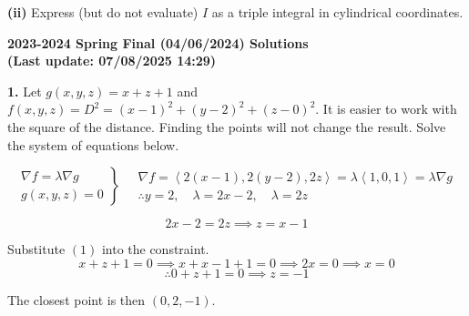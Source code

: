 \documentclass{article}
\begin{document}
\textbf{(ii)} Express (but do not evaluate) ${I}$ as a triple integral in cylindrical coordinates.

\newpage

\begin{center}
\textbf{2023-2024 Spring Final (04/06/2024) Solutions\\
(Last update: 07/08/2025 14:29)}
\end{center}

\textbf{1.} Let $g(x,y,z)=x+z+1$ and $f(x,y,z)=D^2=(x-1)^2+(y-2)^2+(z-0)^2$. It is easier to work with the square of the distance. Finding the points will not change the result. Solve the system of equations below.

\[
\left.
\begin{array}{l}
\displaystyle\nabla f=\lambda\nabla g \\
\displaystyle g(x,y,z)=0
\end{array}
\right\}\quad
\begin{array}{l}
\nabla f=\left\langle2(x-1),2(y-2),2z\right\rangle=\lambda\left\langle1,0,1\right\rangle=\lambda\nabla g\\\therefore y=2, \quad\lambda=2x-2,\quad\lambda=2z
\end{array}
\]

\begin{equation}2x-2=2z\implies z=x-1\end{equation}

Substitute $(1)$ into the constraint.
\[x+z+1=0\implies x+x-1+1=0\implies2x=0\implies x=0\]
\[\therefore 0+z+1=0\implies z=-1\]

The closest point is then $\boxed{(0,2,-1)}$.

\vspace{1em}
\end{document}
